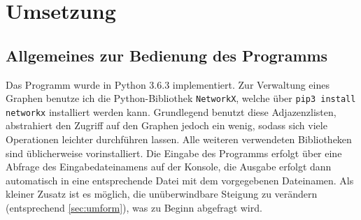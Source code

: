\documentclass[a4paper, notitlepage, 12pt]{scrartcl}
\begin{document}
 \section{Umsetzung}
 \subsection{Allgemeines zur Bedienung des Programms}
 Das Programm wurde in Python 3.6.3 implementiert. Zur Verwaltung eines Graphen benutze ich die Python-Bibliothek \texttt{NetworkX}, welche über \texttt{pip3 install networkx} installiert werden kann. Grundlegend benutzt diese Adjazenzlisten, abstrahiert den Zugriff auf den Graphen jedoch ein wenig, sodass sich viele Operationen leichter durchführen lassen. Alle weiteren verwendeten Bibliotheken sind üblicherweise vorinstalliert. Die Eingabe des Programms erfolgt über eine Abfrage des Eingabedateinamens auf der Konsole, die Ausgabe erfolgt dann automatisch in eine entsprechende Datei mit dem vorgegebenen Dateinamen. Als kleiner Zusatz ist es möglich, die unüberwindbare Steigung zu verändern (entsprechend \autoref{sec:umform}), was zu Beginn abgefragt wird.
\end{document}
